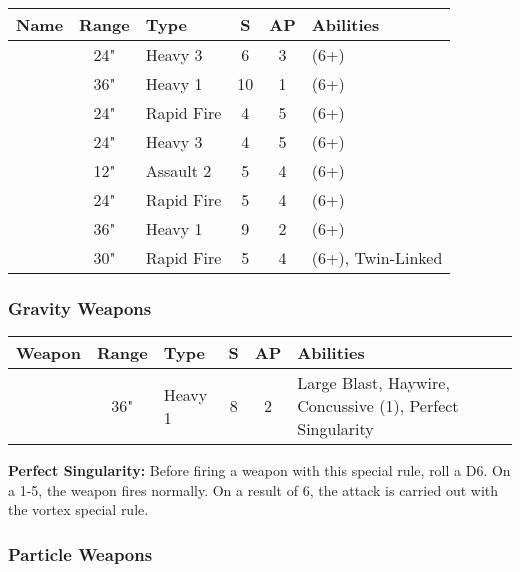 \label{Gauss Cannon} \label{Gauss Destructor} \label{Gauss Blaster} \label{Gauss Flayer} \label{Gauss Flux Arcs} \label{Gauss Reaper} \label{Heavy Gauss Cannon} \label{Relic Gauss Blaster}
\noindent
\begin{NiceTabular}{L{115 pt} c C{40pt} *{2}{c} >{\raggedright\arraybackslash}p{240pt}}
	Name & Range & Type & S & AP & Abilities \\
	\hline
	 & 24" & Heavy 3 & 6 & 3 &  (6+) \\
	  & 36" & Heavy 1 & 10 & 1 &   (6+) \\
	 & 24" & Rapid Fire & 4 & 5 &  (6+) \\
	  & 24" & Heavy 3 & 4 & 5 &  (6+) \\
	 & 12" & Assault 2 & 5 & 4 &  (6+) \\
	  & 24" & Rapid Fire & 5 & 4 &  (6+) \\
	 & 36" & Heavy 1 & 9 & 2 &  (6+) \\
	 & 30" & Rapid Fire & 5 & 4 &  (6+), Twin-Linked \\	
\end{NiceTabular}

\subsubsection{Gravity Weapons}

\label{Singulatiry Generator}
\noindent
\begin{NiceTabular}{L{115 pt} c C{40pt} *{2}{c} >{\raggedright\arraybackslash}p{240pt}}
	Weapon & Range & Type & S & AP & Abilities \\
	\hline
	 & 36" & Heavy 1 & 8 & 2 & Large Blast, Haywire, Concussive (1), Perfect Singularity  \\
\end{NiceTabular}

\vspace*{1em}
\textbf{Perfect Singularity:} Before firing a weapon with this special rule, roll a D6. On a 1-5, the weapon fires normally. On a result of 6, the attack is carried out with the vortex special rule.

\subsubsection{Particle Weapons}

